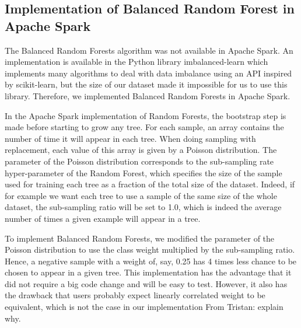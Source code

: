 \documentclass[conference]{IEEEtran}
\newcommand{\TG}[1]{\colorlet{saved}{.}\color{orange}From Tristan: #1\color{saved}}
\begin{document}
\subsection{Implementation of Balanced Random Forest in Apache Spark}

The Balanced Random Forests algorithm was not available in Apache Spark.
An implementation is available in the Python library
imbalanced-learn\cite{imbalance} which implements many algorithms to deal
with data imbalance using an API inspired by scikit-learn, but the size of
our dataset made it impossible for us to use this library. Therefore, we
implemented Balanced Random Forests in Apache Spark.

In the Apache Spark implementation of Random Forests, the bootstrap step is
made before starting to grow any tree. For each sample, an array contains
the number of time it will appear in each tree. When doing sampling with
replacement, each value of this array is given by a Poisson distribution.
The parameter of the Poisson distribution corresponds to the sub-sampling
rate hyper-parameter of the Random Forest, which specifies the size of the
sample used for training each tree as a fraction of the total size of the
dataset. Indeed, if for example we want each tree to use a sample of the
same size of the whole dataset, the sub-sampling ratio will be set to 1.0,
which is indeed the average number of times a given example will appear in a tree.

To implement Balanced Random Forests, we modified the parameter of
the Poisson distribution to use the class weight multiplied by the
sub-sampling ratio. Hence, a negative sample with a weight
of, say, 0.25 has 4 times less chance to be chosen to appear in a given tree. This
implementation has the advantage that it did not require a big code change
and will be easy to test. However, it also has the drawback that users probably
expect linearly correlated weight to be equivalent, which is not the case
in our implementation \TG{explain why}.
\end{document}
